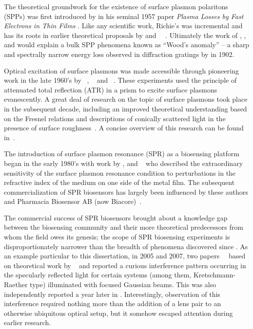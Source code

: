 The theoretical groundwork for the existence of surface plasmon polaritons
(SPPs) was first introduced by  in his seminal 1957 paper
\textit{Plasma Losses by Fast Electrons in Thin Films}
\cite{ritchie1957plasma}.  Like any scientific work, Richie's was
incremental and has its roots in earlier theoretical proposals by
 and
~\cite{bohm1951collective}~\cite{pines1952collective}.
Ultimately the work of , , and  would
explain a bulk SPP phenomena known as ``Wood's anomaly'' -- a sharp and
spectrally narrow energy loss observed in diffraction gratings by
 in 1902.

Optical excitation of surface plasmons was made accessible through
pioneering work in the late 1960's by
~\cite{kretschmann1968},
~\cite{raether1988springer} and
~\cite{otto1968excitation}.  These experiments used the
principle of attenuated total reflection (ATR) in a prism to excite surface
plasmons evanescently.  A great deal of research on the topic of surface
plasmons took place in the subsequent decade, including an improved
theoretical understanding based on the Fresnel relations
\cite{chen1976excitation} and descriptions of conically scattered light in
the presence of surface roughness~\cite{simon1976directional}.  A concise
overview of this research can be found in~\cite{raether1997surface}.

The introduction of surface plasmon resonance (SPR) as a biosensing platform began in the early 1980's
with work by ,  and
~\cite{liedberg1983surface} who described the
extraordinary sensitivity of the surface plasmon resonance condition to
perturbations in the refractive index of the medium on one side of the
metal film.  The subsequent commercialization of SPR biosensors has largely
been influenced by these authors and Pharmacia Biosensor AB (now
Biacore)~\cite{liedberg1995biosensing}.

The commercial success of SPR biosensors brought about a knowledge gap
between the biosensing community and their more theoretical predecessors
from whom the field owes its genesis; the scope of SPR biosensing
experiments is disproportionately narrower than the breadth of phenomena
discovered since .  As an example particular to this
dissertation, in 2005 and 2007, two
papers~\cite{andaloro2005optical}~\cite{simon2007observation} based on
theoretical work by ~\cite{chuang1986lateral} and 
\cite{chen1976excitation} reported a curious interference pattern occurring
in the specularly reflected light for certain systems (among them,
Kretschmann-Raether type) illuminated with focused Gaussian beams.  This
was also independently reported a year later in \cite{schumann2008near}.
Interestingly, observation of this interference required nothing more than
the addition of a lens pair to an otherwise ubiquitous optical setup, but
it somehow escaped attention during earlier research.  

